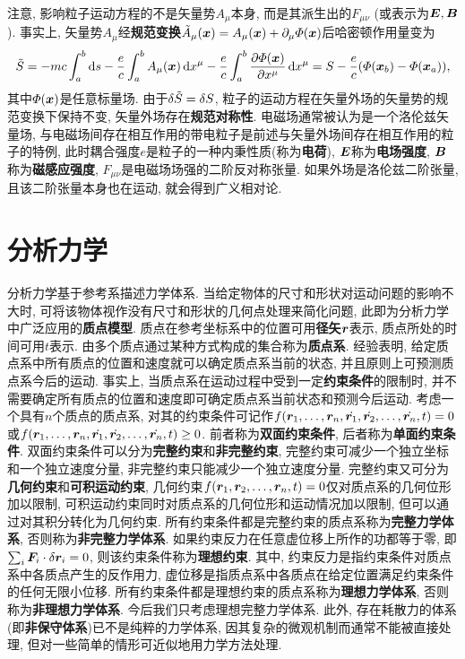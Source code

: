 注意, 影响粒子运动方程的不是矢量势$ A_{\mu} $本身, 而是其派生出的$ F_{\mu\nu} $ (或表示为$ \vb*{E},\vb*{B} $). 事实上, 矢量势$ A_{\mu} $经\textbf{规范变换}$ \tilde{A}_{\mu}(\vb*{x}) = A_{\mu}(\vb*{x}) + \partial_{\mu} \varPhi(\vb*{x}) $后哈密顿作用量变为
\begin{equation*}
    \tilde{S} = -mc \int_a^b \dd{s} - \frac{e}{c} \int_a^b A_{\mu} (\vb*{x}) \dd{x^{\mu}} - \frac{e}{c} \int_a^b \pdv{\varPhi(\vb*{x})}{x^{\mu}} \dd{x^{\mu}} = S - \frac{e}{c} (\varPhi(\vb*{x}_b) - \varPhi(\vb*{x}_a)),
\end{equation*}
其中$ \varPhi(\vb*{x}) $是任意标量场. 由于$ \var{\tilde{S}} = \var{S} $, 粒子的运动方程在矢量外场的矢量势的规范变换下保持不变, 矢量外场存在\textbf{规范对称性}. 电磁场通常被认为是一个洛伦兹矢量场, 与电磁场间存在相互作用的带电粒子是前述与矢量外场间存在相互作用的粒子的特例, 此时耦合强度$ e $是粒子的一种内秉性质(称为\textbf{电荷}), $ \vb*{E} $称为\textbf{电场强度}, $ \vb*{B} $称为\textbf{磁感应强度}, $ F_{\mu\nu} $是电磁场场强的二阶反对称张量. 如果外场是洛伦兹二阶张量, 且该二阶张量本身也在运动, 就会得到广义相对论.
\newpage
\section[分析力学]{分析力学}\label{分析力学}
分析力学基于参考系描述力学体系. 当给定物体的尺寸和形状对运动问题的影响不大时, 可将该物体视作没有尺寸和形状的几何点处理来简化问题, 此即为分析力学中广泛应用的\textbf{质点模型}. 质点在参考坐标系中的位置可用\textbf{径矢}$ \vb*{r} $表示, 质点所处的时间可用$ t $表示. 由多个质点通过某种方式构成的集合称为\textbf{质点系}. 经验表明, 给定质点系中所有质点的位置和速度就可以确定质点系当前的状态, 并且原则上可预测质点系今后的运动. 事实上, 当质点系在运动过程中受到一定\textbf{约束条件}的限制时, 并不需要确定所有质点的位置和速度即可确定质点系当前状态和预测今后运动. 考虑一个具有$ n $个质点的质点系, 对其的约束条件可记作$ f(\vb*{r}_1,\ldots,\vb*{r}_n,\dot{\vb*{r}_1},\dot{\vb*{r}_2},\ldots,\dot{\vb*{r}_n},t)=0 $或$ f(\vb*{r}_1,\ldots,\vb*{r}_n,\dot{\vb*{r}_1},\dot{\vb*{r}_2},\ldots,\dot{\vb*{r}_n},t) \geq 0 $. 前者称为\textbf{双面约束条件}, 后者称为\textbf{单面约束条件}. 双面约束条件可以分为\textbf{完整约束}和\textbf{非完整约束}, 完整约束可减少一个独立坐标和一个独立速度分量, 非完整约束只能减少一个独立速度分量. 完整约束又可分为\textbf{几何约束}和\textbf{可积运动约束}, 几何约束$ f(\vb*{r}_1,\vb*{r}_2,\ldots,\vb*{r}_n,t)=0 $仅对质点系的几何位形加以限制, 可积运动约束同时对质点系的几何位形和运动情况加以限制, 但可以通过对其积分转化为几何约束. 所有约束条件都是完整约束的质点系称为\textbf{完整力学体系}, 否则称为\textbf{非完整力学体系}. 如果约束反力在任意虚位移上所作的功都等于零, 即$ \sum_i \vb*{F}_i \cdot \var{\vb*{r}_i} = 0 $, 则该约束条件称为\textbf{理想约束}. 其中, 约束反力是指约束条件对质点系中各质点产生的反作用力, 虚位移是指质点系中各质点在给定位置满足约束条件的任何无限小位移. 所有约束条件都是理想约束的质点系称为\textbf{理想力学体系}, 否则称为\textbf{非理想力学体系}. 今后我们只考虑理想完整力学体系. 此外, 存在耗散力的体系(即\textbf{非保守体系})已不是纯粹的力学体系, 因其复杂的微观机制而通常不能被直接处理, 但对一些简单的情形可近似地用力学方法处理.

